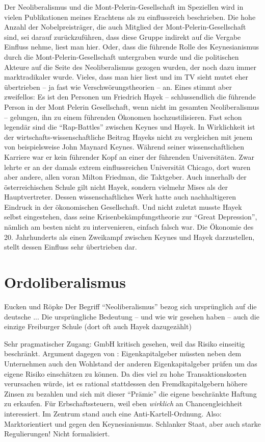 Der Neoliberalismus und die Mont-Pelerin-Gesellschaft im Speziellen wird in vielen Publikationen meines Erachtens als zu einflussreich beschrieben. Die hohe Anzahl der Nobelpreisträger, die auch Mitglied der Mont-Pelerin-Gesellschaft sind, sei darauf zurückzuführen, dass diese Gruppe indirekt auf die Vergabe Einfluss nehme, liest man hier. Oder, dass die führende Rolle des Keynesianismus durch die Mont-Pelerin-Gesellschaft untergraben wurde und die politischen Akteure auf die Seite des Neoliberalismus gezogen wurden, der noch dazu immer marktradikaler wurde. Vieles, dass man hier liest und im TV sieht mutet eher übertrieben -- ja fast wie Verschwörungstheorien -- an. Eines stimmt aber zweifellos: Es ist den Personen um Friedrich Hayek -- schlussendlich die führende Person in der Mont Pelerin Gesellschaft, wenn nicht im gesamten Neoliberalismus -- gelungen, ihn zu einem führenden Ökonomen hochzustilisieren. Fast schon legendär sind die "`Rap-Battles"' zwischen Keynes und Hayek. In Wirklichkeit ist der wirtschafts-wissenschaftliche Beitrag Hayeks nicht zu vergleichen mit jenem von beispielsweise John Maynard Keynes. Während seiner wissenschaftlichen Karriere war er kein führender Kopf an einer der führenden Universitäten. Zwar lehrte er an der damals extrem einflussreichen Universität Chicago, dort waren aber andere, allen voran Milton Friedman, die Taktgeber. Auch innerhalb der österreichischen Schule gilt nicht Hayek, sondern vielmehr Mises als der Hauptvertreter. Dessen wissenschaftliches Werk hatte auch nachhaltigeren Eindruck in der ökonomischen Gesellschaft. Und nicht zuletzt musste Hayek selbst eingestehen, dass seine Krisenbekämpfungstheorie zur "`Great Depression"', nämlich am besten nicht zu intervenieren, einfach falsch war. Die Ökonomie des 20. Jahrhunderts als einen Zweikampf zwischen Keynes und Hayek darzustellen, stellt dessen Einfluss sehr übertrieben dar.







\section{Ordoliberalismus}
\label{Ordoliberalismus}

Eucken und Röpke
Der Begriff "`Neoliberalismus"' bezog sich ursprünglich auf die deutsche ...
Die ursprüngliche Bedeutung -- und wie wir gesehen haben -- auch die einzige 
Freiburger Schule (dort oft auch Hayek dazugezählt)


Sehr pragmatischer Zugang: GmbH kritisch gesehen, weil das Risiko einseitig beschränkt. Argument dagegen von \textcite[S. 36]{Jensen1976}: Eigenkapitalgeber müssten neben dem Unternehmen auch den Wohlstand der anderen Eigenkapitalgeber prüfen um das eigene Risiko einschätzen zu können. Da dies viel zu hohe Transaktionskosten verursachen würde, ist es rational stattdessen den Fremdkapitalgebern höhere Zinsen zu bezahlen und sich mit dieser "`Prämie"' die eigene beschränkte Haftung zu erkaufen.
Für Erbschaftssteuern, weil eben \textit{wirklich} an Chancengleichheit interessiert. Im Zentrum stand auch eine Anti-Kartell-Ordnung.
Also: Marktorientiert und gegen den Keynesianismus. Schlanker Staat, aber auch starke Regulierungen!
Nicht formalisiert. 


